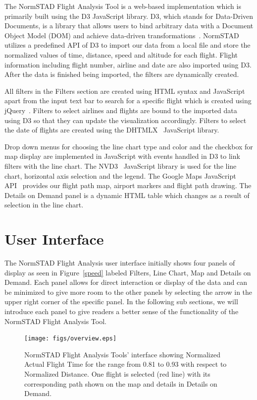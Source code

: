 \documentclass{sig-alternate}
\begin{document}
The NormSTAD Flight Analysis Tool is a web-based implementation which is primarily built
using the D3 JavaScript library. D3, which stands for Data-Driven Documents, is a 
library that allows users to bind arbitrary data with a Document Object Model (DOM)
and achieve data-driven transformations~\cite{D3}. NormSTAD utilizes a predefined API of D3
to import our data from a local file
 and store the normalized values of time, distance, speed and altitude
for each flight. Flight information including flight number, airline and date are also imported
using D3. After the data is finished being imported, the filters are dynamically created.

All filters in the Filters section
 are created using HTML syntax and JavaScript apart from the input text bar
to search for a specific flight which is created using jQuery~\cite{jQuery}.
Filters to select airlines and flights are bound to the imported data using D3 so that
they can update the visualization accordingly. Filters to select the date of flights
are created using the DHTMLX~\cite{DHTMLX} JavaScript library.

Drop down menus for choosing the line chart type and color and the checkbox for map display
are implemented in JavaScript with events handled in D3 to link filters with the line chart.
The NVD3~\cite{NVD3} JavaScript library is used for the line chart, horizontal axis 
selection and the legend. The Google Maps JavaScript API~\cite{API} provides our flight path map,
airport markers and flight path drawing. The Details on Demand panel is a dynamic
HTML table which changes as a result of selection in the line chart.



\section{User Interface}
\label{sec-interface}

The NormSTAD Flight Analysis user interface initially shows four panels of display as seen in 
Figure~\ref{speed} labeled Filters, Line Chart, Map and Details on Demand. Each panel allows for 
direct interaction or display of the data and can be minimized to
give more room to the other panels by selecting 
the arrow in the upper right corner of the specific panel. In the following sub sections, we 
will introduce each panel to give readers a better sense of the functionality of the 
NormSTAD Flight Analysis Tool.


\begin{figure}
\centering
\texttt{[image: figs/overview.eps]}
\caption{
NormSTAD Flight Analysis Tools' interface showing Normalized Actual Flight Time
for the range from 0.81 to 0.93 with 
respect to Normalized Distance. One flight is selected (red line) with its 
corresponding path shown on the map and details in Details on Demand.
}
\label{overview}
\end{figure}
\end{document}
